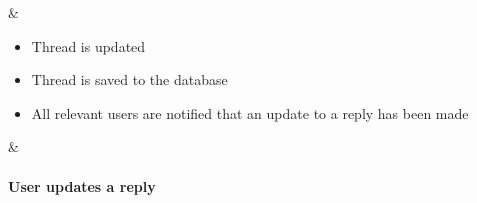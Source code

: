 \begin{table}
\begin{tabularx}{\textwidth}
\begin{itemize}
					
					
				\end{itemize} &
				\begin{itemize}
					\item Thread is updated
					\item Thread is saved to the database
						\item All relevant users are notified that an update to a reply has been made
					
					
					
				\end{itemize} &
				\paragraph{User updates a reply}
				\\
				\hline
	

	\end{tabularx}
\end{table}
\newpage
